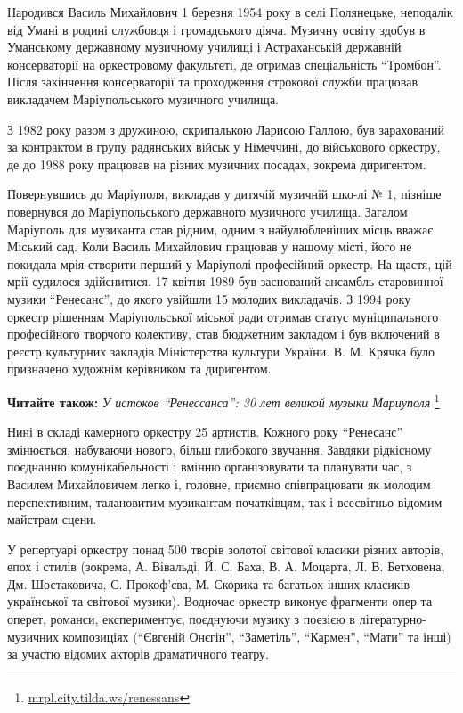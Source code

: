 Народився Василь Михайлович 1 березня 1954 року в селі Полянецьке, неподалік
від Умані в родині службовця і громадського діяча. Музичну освіту здобув в
Уманському державному музичному училищі і Астраханській державній консерваторії
на оркестровому факультеті, де отримав спеціальність \enquote{Тромбон}. Після
закінчення консерваторії та проходження строкової служби працював викладачем
Маріупольського музичного училища.

З 1982 року разом з дружиною, скрипалькою Ларисою Галлою, був зарахований за
контрактом в групу радянських військ у Німеччині, до військового оркестру, де
до 1988 року працював на різних музичних посадах, зокрема диригентом.


Повернувшись до Маріуполя, викладав у дитячій музичній шко\hyp{}лі № 1, пізніше
повернувся до Маріупольського державного музичного училища. Загалом Маріуполь
для музиканта став рідним, одним з найулюбленіших місць вважає Міський сад.
Коли Василь Михайлович працював у нашому місті, його не покидала мрія створити
перший у Маріуполі професійний оркестр. На щастя, цій мрії судилося
здійснитися. 17 квітня 1989 був заснований ансамбль старовинної музики
\enquote{Ренесанс}, до якого увійшли 15 молодих викладачів. З 1994 року оркестр
рішенням Маріупольської міської ради отримав статус муніципального професійного
творчого колективу, став бюджетним закладом і був включений в реєстр культурних
закладів Міністерства культури України. В. М. Крячка було призначено художнім
керівником та диригентом.

\textbf{Читайте також:} \emph{У истоков \enquote{Ренессанса}: 30 лет великой музыки Мариуполя}%
\footnote{\url{mrpl.city.tilda.ws/renessans}}

Нині в складі камерного оркестру 25 артистів. Кожного року \enquote{Ренесанс}
змінюється, набуваючи нового, більш глибокого звучання. Завдяки рідкісному
поєднанню комунікабельності і вмінню організовувати та планувати час, з Василем
Михайловичем легко і, головне, приємно співпрацювати як молодим перспективним,
талановитим музикантам-початківцям, так і всесвітньо відомим майстрам сцени.

У репертуарі оркестру понад 500 творів золотої світової класики різних авторів,
епох і стилів (зокрема, А. Вівальді, Й. С. Баха, В. А. Моцарта, Л. В. Бетховена,
Дм. Шостаковича, С. Прокоф'єва, М. Скорика та багатьох інших класиків
української та світової музики). Водночас оркестр виконує фрагменти опер та
оперет, романси, експериментує, поєднуючи музику з поезією в
літературно-музичних композиціях (\enquote{Євгеній Онєгін}, \enquote{Заметіль}, \enquote{Кармен},
\enquote{Мати} та інші) за участю відомих акторів драматичного театру.


